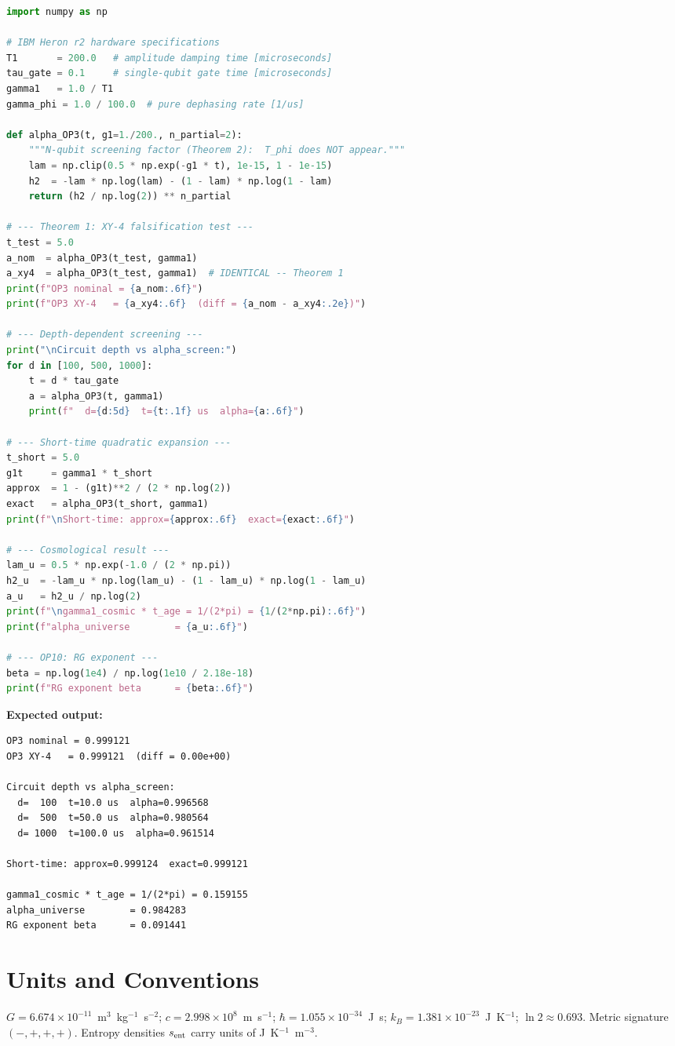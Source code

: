 \documentclass[12pt]{article}
\begin{document}
\begin{lstlisting}[language=Python, caption={Complete validation code.
All key results derivable from hardware specifications alone.}]
import numpy as np

# IBM Heron r2 hardware specifications
T1       = 200.0   # amplitude damping time [microseconds]
tau_gate = 0.1     # single-qubit gate time [microseconds]
gamma1   = 1.0 / T1
gamma_phi = 1.0 / 100.0  # pure dephasing rate [1/us]

def alpha_OP3(t, g1=1./200., n_partial=2):
    """N-qubit screening factor (Theorem 2):  T_phi does NOT appear."""
    lam = np.clip(0.5 * np.exp(-g1 * t), 1e-15, 1 - 1e-15)
    h2  = -lam * np.log(lam) - (1 - lam) * np.log(1 - lam)
    return (h2 / np.log(2)) ** n_partial

# --- Theorem 1: XY-4 falsification test ---
t_test = 5.0
a_nom  = alpha_OP3(t_test, gamma1)
a_xy4  = alpha_OP3(t_test, gamma1)  # IDENTICAL -- Theorem 1
print(f"OP3 nominal = {a_nom:.6f}")
print(f"OP3 XY-4   = {a_xy4:.6f}  (diff = {a_nom - a_xy4:.2e})")

# --- Depth-dependent screening ---
print("\nCircuit depth vs alpha_screen:")
for d in [100, 500, 1000]:
    t = d * tau_gate
    a = alpha_OP3(t, gamma1)
    print(f"  d={d:5d}  t={t:.1f} us  alpha={a:.6f}")

# --- Short-time quadratic expansion ---
t_short = 5.0
g1t     = gamma1 * t_short
approx  = 1 - (g1t)**2 / (2 * np.log(2))
exact   = alpha_OP3(t_short, gamma1)
print(f"\nShort-time: approx={approx:.6f}  exact={exact:.6f}")

# --- Cosmological result ---
lam_u = 0.5 * np.exp(-1.0 / (2 * np.pi))
h2_u  = -lam_u * np.log(lam_u) - (1 - lam_u) * np.log(1 - lam_u)
a_u   = h2_u / np.log(2)
print(f"\ngamma1_cosmic * t_age = 1/(2*pi) = {1/(2*np.pi):.6f}")
print(f"alpha_universe        = {a_u:.6f}")

# --- OP10: RG exponent ---
beta = np.log(1e4) / np.log(1e10 / 2.18e-18)
print(f"RG exponent beta      = {beta:.6f}")
\end{lstlisting}

\noindent\textbf{Expected output:}
\begin{lstlisting}
OP3 nominal = 0.999121
OP3 XY-4   = 0.999121  (diff = 0.00e+00)

Circuit depth vs alpha_screen:
  d=  100  t=10.0 us  alpha=0.996568
  d=  500  t=50.0 us  alpha=0.980564
  d= 1000  t=100.0 us  alpha=0.961514

Short-time: approx=0.999124  exact=0.999121

gamma1_cosmic * t_age = 1/(2*pi) = 0.159155
alpha_universe        = 0.984283
RG exponent beta      = 0.091441
\end{lstlisting}

\section{Units and Conventions}
\label{app:units}

$G = 6.674\times 10^{-11}$~m$^3$~kg$^{-1}$~s$^{-2}$;
$c = 2.998\times 10^8$~m~s$^{-1}$;
$\hbar = 1.055\times 10^{-34}$~J~s;
$k_B = 1.381\times 10^{-23}$~J~K$^{-1}$;
$\ln 2 \approx 0.693$.
Metric signature $(-, +, +, +)$.
Entropy densities $s_{\rm ent}$ carry units of J~K$^{-1}$~m$^{-3}$.
\end{document}
